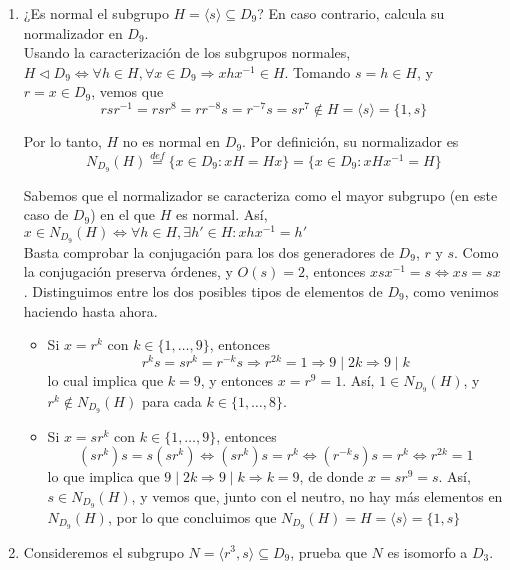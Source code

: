 \documentclass[12pt]{article}
\begin{document}
\begin{ejercicio}[3 puntos]
\begin{enumerate}[label=(\alph*)]
            \item ¿Es normal el subgrupo $H = \langle s \rangle \subseteq D_9$? En caso contrario, calcula su normalizador en $D_9$. \\
            
            Usando la caracterización de los subgrupos normales, $H \vartriangleleft D_9 \iff \forall h \in H, \forall x \in D_9 \Longrightarrow xhx^{-1} \in H$. Tomando $s = h \in H$, y $r = x \in D_9$, vemos que
            $$rsr^{-1} = rsr^{8} = rr^{-8}s = r^{-7}s = sr^{7} \notin H = \langle s \rangle = \{1,s\}$$

            Por lo tanto, $H$ no es normal en $D_9$. Por definición, su normalizador es $$N_{D_9}(H) \stackrel{def}{=} \{x \in D_9 : xH = Hx\} = \{x \in D_9 : xHx^{-1} = H\}$$

            Sabemos que el normalizador se caracteriza como el mayor subgrupo (en este caso de $D_9$) en el que $H$ es normal. Así, $x \in N_{D_9}(H) \iff \forall h \in H, \exists h' \in H : xhx^{-1} = h'$ \\

            Basta comprobar la conjugación para los dos generadores de $D_9$, $r$ y $s$. Como la conjugación preserva órdenes, y $O(s) = 2$, entonces $xsx^{-1} = s \iff xs = sx$. Distinguimos entre los dos posibles tipos de elementos de $D_9$, como venimos haciendo hasta ahora.

            \begin{itemize}
                \item Si $x = r^k$ con $k \in \{1, \ldots, 9\}$, entonces $$r^k s = s r^k = r^{-k} s \Longrightarrow r^{2k} = 1 \Longrightarrow 9 \mid 2k \Longrightarrow 9 \mid k$$ lo cual implica que $k=9$, y entonces $x = r^9 = 1$. Así, $1 \in N_{D_9}(H)$, y $r^k \notin N_{D_9}(H)$ 
                para cada $k \in \{1, \ldots, 8\}$.
                \item Si $x = sr^k$ con $k \in \{1, \ldots, 9\}$, entonces $$(sr^k)s = s(sr^k) \iff (sr^k)s = r^k \iff (r^{-k}s)s = r^k \iff r^{2k} = 1$$
                lo que implica que $9 \mid 2k \Longrightarrow 9 \mid k \Longrightarrow k=9$, de donde $x = sr^9 = s$. Así, $s \in N_{D_9}(H)$, y vemos que, junto con el neutro, no hay más elementos en $N_{D_9}(H)$, por lo que concluimos que $N_{D_9}(H) = H = \langle s \rangle = \{1,s\}$
             \end{itemize}

            \item Consideremos el subgrupo $N = \langle r^3, s \rangle \subseteq D_9$, prueba que $N$ es isomorfo a $D_3$. \\
            

\end{enumerate}
\end{ejercicio}
\end{document}
